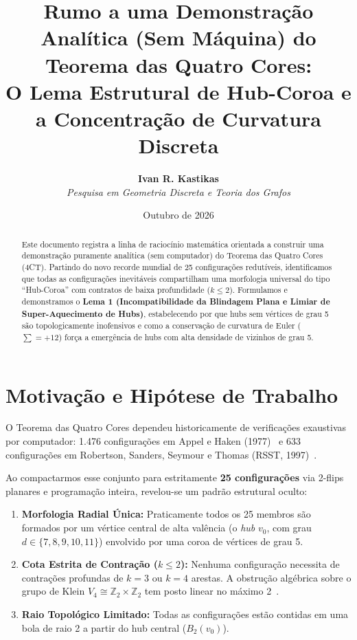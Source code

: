 \documentclass[11pt,a4paper]{article}
\title{\textbf{\Large Rumo a uma Demonstração Analítica (Sem Máquina) do Teorema das Quatro Cores:}\\
\large O Lema Estrutural de Hub-Coroa e a Concentração de Curvatura Discreta}
\author{
  \textbf{Ivan R. Kastikas} \\
  \textit{Pesquisa em Geometria Discreta e Teoria dos Grafos}
}
\date{Outubro de 2026}
\theoremstyle{plain}
\theoremstyle{definition}
\begin{document}
\maketitle

\begin{abstract}
Este documento registra a linha de raciocínio matemática orientada a construir uma demonstração puramente analítica (sem computador) do Teorema das Quatro Cores (4CT). Partindo do novo recorde mundial de 25 configurações redutíveis, identificamos que todas as configurações inevitáveis compartilham uma morfologia universal do tipo ``Hub-Coroa'' com contratos de baixa profundidade ($k \le 2$). Formulamos e demonstramos o \textbf{Lema 1 (Incompatibilidade da Blindagem Plana e Limiar de Super-Aquecimento de Hubs)}, estabelecendo por que hubs sem vértices de grau 5 são topologicamente inofensivos e como a conservação de curvatura de Euler ($\sum = +12$) força a emergência de hubs com alta densidade de vizinhos de grau 5.
\end{abstract}

\section{Motivação e Hipótese de Trabalho}

O Teorema das Quatro Cores dependeu historicamente de verificações exaustivas por computador: 1.476 configurações em Appel e Haken (1977)~\cite{appel1977every1, appel1977every2} e 633 configurações em Robertson, Sanders, Seymour e Thomas (RSST, 1997)~\cite{robertson1997four}. 

Ao compactarmos esse conjunto para estritamente \textbf{25 configurações} via 2-flips planares e programação inteira, revelou-se um padrão estrutural oculto:
\begin{enumerate}
    \item \textbf{Morfologia Radial Única:} Praticamente todos os 25 membros são formados por um vértice central de alta valência (o \emph{hub} $v_0$, com grau $d \in \{7, 8, 9, 10, 11\}$) envolvido por uma coroa de vértices de grau 5.
    \item \textbf{Cota Estrita de Contração ($k \le 2$):} Nenhuma configuração necessita de contrações profundas de $k=3$ ou $k=4$ arestas. A obstrução algébrica sobre o grupo de Klein $V_4 \cong \mathbb{Z}_2 \times \mathbb{Z}_2$ tem posto linear no máximo 2~\cite{stromquist1975some}.
    \item \textbf{Raio Topológico Limitado:} Todas as configurações estão contidas em uma bola de raio 2 a partir do hub central ($B_2(v_0)$).
\end{enumerate}
\end{document}
